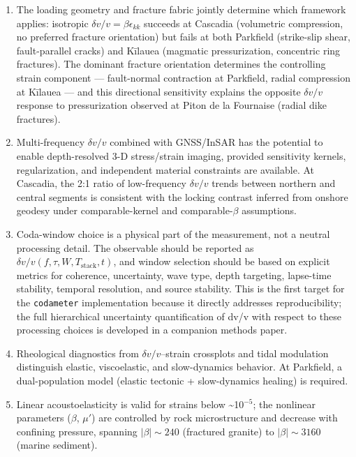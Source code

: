 \documentclass[draft]{agujournal2019}
\begin{document}
\begin{enumerate}
  was derived for isotropic loading). These results use only published
  measurements; end-to-end validation on independently reprocessed data
  is future work (§10.5). The effective \(|\beta|\) for fractured
  crystalline rock (granite, basalt) clusters around 200--400, while
  unconsolidated marine sediment gives \(|\beta| \sim 3000\).
\item
  The loading geometry and fracture fabric jointly determine which
  framework applies: isotropic \(\delta v/v = \beta\epsilon_{kk}\)
  succeeds at Cascadia (volumetric compression, no preferred fracture
  orientation) but fails at both Parkfield (strike-slip shear,
  fault-parallel cracks) and Kīlauea (magmatic pressurization,
  concentric ring fractures). The dominant fracture orientation
  determines the controlling strain component --- fault-normal
  contraction at Parkfield, radial compression at Kīlauea --- and this
  directional sensitivity explains the opposite \(\delta v/v\) response
  to pressurization observed at Piton de la Fournaise (radial dike
  fractures).
\item
  Multi-frequency \(\delta v/v\) combined with GNSS/InSAR has the
  potential to enable depth-resolved 3-D stress/strain imaging, provided
  sensitivity kernels, regularization, and independent material
  constraints are available. At Cascadia, the 2:1 ratio of low-frequency
  \(\delta v/v\) trends between northern and central segments is
  consistent with the locking contrast inferred from onshore geodesy
  under comparable-kernel and comparable-\(\beta\) assumptions.
\item
  Coda-window choice is a physical part of the measurement, not a
  neutral processing detail. The observable should be reported as
  \(\delta v/v(f,\tau,W,T_{\mathrm{stack}},t)\), and window selection
  should be based on explicit metrics for coherence, uncertainty, wave
  type, depth targeting, lapse-time stability, temporal resolution, and
  source stability. This is the first target for the \texttt{codameter}
  implementation because it directly addresses reproducibility; the full
  hierarchical uncertainty quantification of dv/v with respect to these
  processing choices is developed in a companion methods paper.
\item
  Rheological diagnostics from \(\delta v/v\)--strain crossplots and
  tidal modulation distinguish elastic, viscoelastic, and slow-dynamics
  behavior. At Parkfield, a dual-population model (elastic tectonic +
  slow-dynamics healing) is required.
\item
  Linear acoustoelasticity is valid for strains below
  \textasciitilde{}10\(^{-5}\); the nonlinear parameters (\(\beta\),
  \(\mu'\)) are controlled by rock microstructure and decrease with
  confining pressure, spanning \(|\beta| \sim 240\) (fractured granite)
  to \(|\beta| \sim 3160\) (marine sediment).
\end{enumerate}
\end{document}
